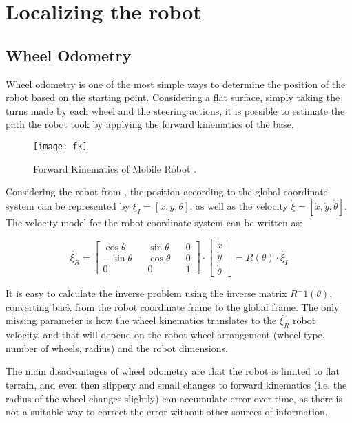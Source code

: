 \section{Localizing the robot}

\subsection{Wheel Odometry}

Wheel odometry is one of the most simple ways to determine the position of the robot based on the starting point. Considering a flat surface, simply taking the turns made by each wheel and the steering actions, it is possible to estimate the path the robot took by applying the forward kinematics of the base.

\begin{figure}
    \centering
    \texttt{[image: fk]}
    \caption{Forward Kinematics of Mobile Robot \cite{thrun2005probabilistic}.}
    \label{fig:fk}
\end{figure}

Considering the robot from , the position according to the global coordinate system can be represented by $\xi_I = [x, y, \theta]$, as well as the velocity $\dot{\xi} = [\dot{x}, \dot{y}, \dot{\theta}]$. The velocity model for the robot coordinate system can be written as:

\begin{equation}
\dot{\xi_R} = 
\begin{bmatrix}
\cos \theta && \sin \theta && 0 \\
- \sin \theta  && \cos \theta && 0 \\
0 && 0 && 1
\end{bmatrix}
\cdot 
\begin{bmatrix}
\dot{x} \\
\dot{y} \\
\dot{\theta}
\end{bmatrix}
=
R(\theta) \cdot \dot{\xi_I}
\end{equation}

It is easy to calculate the inverse problem using the inverse matrix $R^-1(\theta)$, converting back from the robot coordinate frame to the global frame. The only missing parameter is how the wheel kinematics translates to the $\dot{\xi_R}$ robot velocity, and that will depend on the robot wheel arrangement (wheel type, number of wheels, radius) and the robot dimensions.

The main disadvantages of wheel odometry are that the robot is limited to flat terrain, and even then slippery and small changes to forward kinematics (i.e. the radius of the wheel changes slightly) can accumulate error over time, as there is not a suitable way to correct the error without other sources of information.

